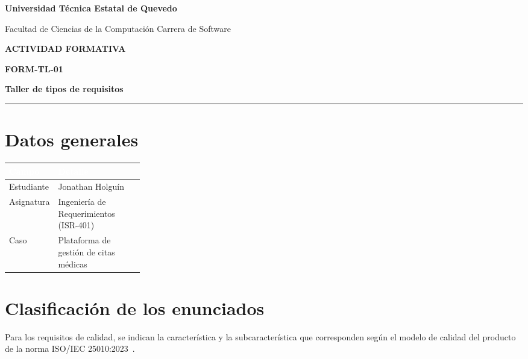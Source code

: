 \documentclass[11pt,a4paper]{article}
\newcommand{\estudiante}{Jonathan Holguín}
\newcommand{\asignatura}{Ingeniería de Requerimientos (ISR-401)}
\newcommand{\cabeceraTabla}[1]{\textcolor{white}{\textbf{#1}}}
\begin{document}
\begin{center}
  {\Large\bfseries\color{VerdeUteq} Universidad Técnica Estatal de Quevedo\par}
  \vspace{0.3em}
  {\small Facultad de Ciencias de la Computación
    \textcolor{Dorado}{\textbullet} Carrera de Software\par}
  \vspace{1em}
  {\large\bfseries\color{AzulTitulo} ACTIVIDAD FORMATIVA\par}
  \vspace{0.25em}
  {\large\bfseries FORM-TL-01\par}
  {\Large\bfseries\color{VerdeUteq} Taller de tipos de requisitos\par}
\end{center}
\noindent\textcolor{Dorado}{\rule{\linewidth}{0.8pt}}

\section{Datos generales}

{\renewcommand{\arraystretch}{1.2}
\noindent\begin{tabularx}{\linewidth}{|p{0.26\linewidth}|X|}
  \hline
  \rowcolor{VerdeTabla}
  \cabeceraTabla{Campo} & \cabeceraTabla{Detalle} \\ \hline
  Estudiante & \estudiante \\ \hline
  Asignatura & \asignatura \\ \hline
  Caso & Plataforma de gestión de citas médicas \\ \hline
\end{tabularx}}

\section{Clasificación de los enunciados}

Para los requisitos de calidad, se indican la característica y la
subcaracterística que corresponden según el modelo de calidad del producto
de la norma ISO/IEC 25010:2023~\cite{iso25010}.
\end{document}
